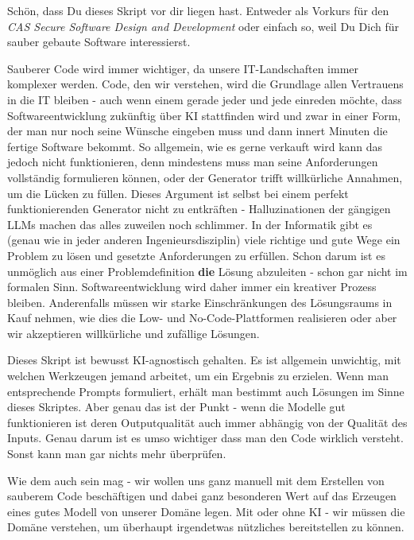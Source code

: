 Schön, dass Du dieses Skript vor dir liegen hast. 
Entweder als Vorkurs für den 
\textit{CAS Secure Software Design and Development} oder einfach so, 
weil Du Dich für sauber gebaute Software interessierst. 

Sauberer Code wird immer wichtiger, da unsere IT-Landschaften immer
komplexer werden. Code, den wir verstehen, wird die Grundlage allen
Vertrauens in die IT bleiben - auch wenn einem gerade jeder und jede
einreden möchte, dass Softwareentwicklung zukünftig über KI stattfinden
wird und zwar in einer Form, der man nur noch seine Wünsche eingeben muss
und dann innert Minuten die fertige Software bekommt. 
So allgemein, wie es gerne verkauft wird kann das jedoch nicht funktionieren,
denn mindestens muss man seine Anforderungen vollständig formulieren können,
oder der Generator trifft willkürliche Annahmen, um die Lücken zu füllen.
Dieses Argument ist selbst bei einem perfekt funktionierenden Generator
nicht zu entkräften - Halluzinationen der gängigen LLMs machen das alles
zuweilen noch schlimmer. In der Informatik gibt es (genau wie in jeder
anderen Ingenieursdisziplin) viele richtige und gute Wege ein Problem
zu lösen und gesetzte Anforderungen zu erfüllen. Schon darum ist es
unmöglich aus einer Problemdefinition \textbf{die} Lösung abzuleiten
- schon gar nicht im formalen Sinn. Softwareentwicklung wird daher
immer ein kreativer Prozess bleiben. Anderenfalls müssen wir starke
Einschränkungen des Lösungsraums in Kauf nehmen, wie dies die Low-
und No-Code-Plattformen realisieren oder aber wir akzeptieren willkürliche
und zufällige Lösungen.

Dieses Skript ist bewusst KI-agnostisch gehalten. Es ist allgemein unwichtig,
mit welchen Werkzeugen jemand arbeitet, um ein Ergebnis zu erzielen. Wenn
man entsprechende Prompts formuliert, erhält man bestimmt auch Lösungen
im Sinne dieses Skriptes. Aber genau das ist der Punkt - wenn die Modelle
gut funktionieren ist deren Outputqualität auch immer abhängig von der
Qualität des Inputs. Genau darum ist es umso wichtiger dass man den
Code wirklich versteht. Sonst kann man gar nichts mehr überprüfen.

Wie dem auch sein mag - wir wollen uns ganz manuell mit dem Erstellen
von sauberem Code beschäftigen und dabei ganz besonderen Wert auf 
das Erzeugen eines gutes Modell von unserer Domäne legen. 
Mit oder ohne KI - 
wir müssen die Domäne verstehen, um überhaupt irgendetwas nützliches
bereitstellen zu können.


